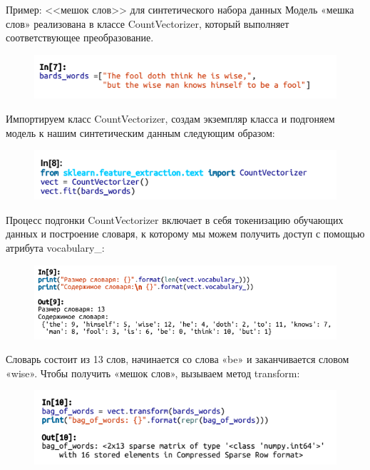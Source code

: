 \documentclass{beamer}
\begin{document}
\begin{frame}{Пример: <<мешок слов>> для синтетического набора данных}
Модель «мешка слов» реализована в классе CountVectorizer, который выполняет соответствующее преобразование. 
\begin{figure}[h]
\centering
\includegraphics[scale=0.7]{images/lec09-pic07.png}
\end{figure}
Импортируем класс CountVectorizer, создам экземпляр класса и подгоняем модель к нашим синтетическим данным следующим образом:
\begin{figure}[h]
\centering
\includegraphics[scale=0.7]{images/lec09-pic08.png}
\end{figure}
\end{frame}

\begin{frame}
Процесс подгонки CountVectorizer включает в себя токенизацию обучающих данных и построение словаря, к которому мы можем получить доступ с помощью атрибута vocabulary\_: 
\begin{figure}[h]
\centering
\includegraphics[scale=0.6]{images/lec09-pic09.png}
\end{figure}
Словарь состоит из 13 слов, начинается со слова «be» и заканчивается словом «wise». Чтобы получить «мешок слов», вызываем метод transform:
\begin{figure}[h]
\centering
\includegraphics[scale=0.6]{images/lec09-pic10.png}
\end{figure}
\end{frame}
\end{document}
